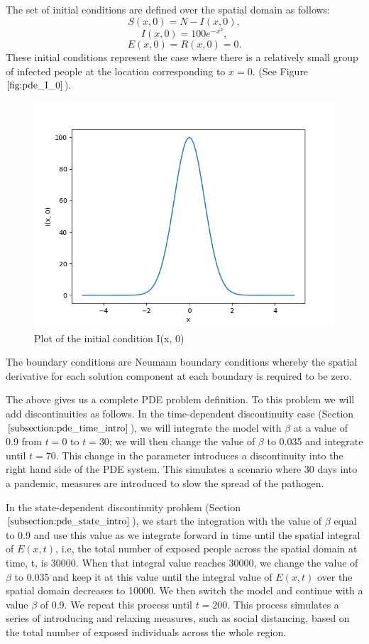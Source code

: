 The set of initial conditions are defined over the spatial domain as follows:
\begin{equation}
S(x, 0) = N - I(x, 0),
\end{equation}
\begin{equation}
I(x, 0) = 100e^{-x^2},
\end{equation}
\begin{equation}
E(x, 0) = R(x, 0) = 0.
\end{equation}
These initial conditions represent the case where there is a relatively small group of infected people at the location corresponding to $x=0$. (See Figure $\ref{fig:pde_I_0}$).

\begin{figure}[H]
\centering
\includegraphics[width=0.7\linewidth]{./figures/pde_I_0}
\caption{Plot of the initial condition I(x, 0)}
\label{fig:pde_I_0}
\end{figure}

The boundary conditions are Neumann boundary conditions whereby the spatial derivative for each solution component at each boundary is required to be zero.

The above gives us a complete PDE problem definition. To this problem we will add discontinuities as follows. 
In the time-dependent discontinuity case (Section $\ref{subsection:pde_time_intro}$), we will integrate the model with $\beta$ at a value of 0.9 from $t=0$ to $t=30$; we will then change the value of $\beta$ to 0.035 and integrate until $t=70$. This change in the parameter introduces a discontinuity into the right hand side of the PDE system. This simulates a scenario where 30 days into a pandemic, measures are introduced to slow the spread of the pathogen.

In the state-dependent discontinuity problem (Section $\ref{subsection:pde_state_intro}$), we start the integration with the value of $\beta$ equal to 0.9 and use this value as we integrate forward in time until the spatial integral of $E(x, t)$, i.e, the total number of exposed people across the spatial domain at time, t, is 30000. When that integral value reaches 30000, we change the value of $\beta$ to 0.035 and keep it at this value until the integral value of $E(x, t)$ over the spatial domain decreases to 10000. We then switch the model and continue with a value $\beta$ of 0.9. We repeat this process until $t=200$. This process simulates a series of introducing and relaxing measures, such as social distancing, based on the total number of exposed individuals across the whole region.

